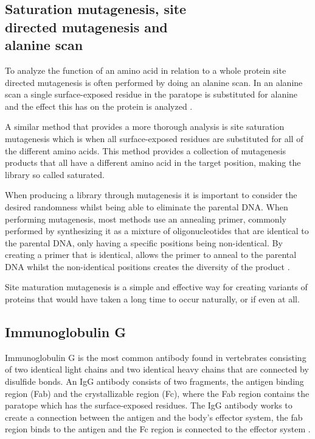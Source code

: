 \documentclass{article}
\begin{document}
\begin{multicols}{2}
	
	\subsection[Saturation mutagenesis, site directed mutagenesis and alanine scan]{Saturation mutagenesis, site\\directed mutagenesis and\\alanine scan}
	To analyze the function of an amino acid in relation to a whole protein site directed mutagenesis is often performed by doing an alanine scan. In an alanine scan a single surface-exposed residue in the paratope is substituted for alanine and the effect this has on the protein is analyzed \cite{morrison_combinatorial_2001}.
	
	A similar method that provides a more thorough analysis is site saturation mutagenesis which is when all surface-exposed residues are substituted for all of the different amino acids. This method provides a collection of mutagenesis products that all have a different amino acid in the target position, making the library so called saturated. 
	
	When producing a library through mutagenesis it is important to consider the desired randomness whilst being able to eliminate the parental DNA. When performing mutagenesis, most methods use an annealing primer, commonly performed by synthesizing it as a mixture of oligonucleotides that are identical to the parental DNA, only having a specific positions being non-identical. By creating a primer that is identical, allows the primer to anneal to the parental DNA whilst the non-identical positions creates the diversity of the product \cite{siloto_site_2012}. 
	
	Site maturation mutagenesis is a simple and effective way for creating variants of proteins that would have taken a long time to occur naturally, or if even at all. 
	 
	
	\subsection{Immunoglobulin G}
	Immunoglobulin G is the most common antibody found in vertebrates consisting of two identical light chains and two identical heavy chains that are connected by disulfide bonds. An IgG antibody consists of two fragments, the antigen binding region (Fab) and the crystallizable region (Fc), where the Fab region contains the paratope which has the surface-exposed residues. The IgG antibody works to create a connection between the antigen and the body’s effector system, the fab region binds to the antigen and the Fc region is connected to the effector system \cite{sanders_chapter_2008}. 
	

\end{multicols}
\end{document}
